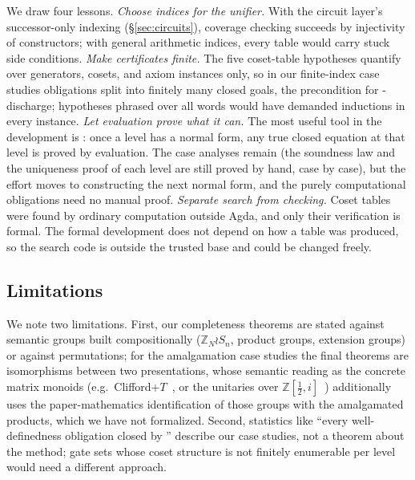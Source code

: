 We draw four lessons.  \emph{Choose indices for
the unifier.}  With the circuit layer's successor-only indexing
(\S\ref{sec:circuits}), coverage checking succeeds by injectivity of
constructors; with general arithmetic indices, every table would carry
stuck side conditions.  \emph{Make certificates finite.}  The five coset-table
hypotheses quantify over generators, cosets, and axiom instances only,
so in our finite-index case studies obligations split into finitely many closed goals, the
precondition for -discharge; hypotheses phrased over all words
would have demanded inductions in every instance.  \emph{Let evaluation
prove what it can.}  The most useful tool in the development
is : once a level has a normal form, any true
closed equation at that level is proved by evaluation.  The case analyses
remain (the soundness law and
the uniqueness proof of each level are still proved by hand, case by
case), but the effort moves to constructing the next normal form,
and the purely computational obligations need no manual proof.
\emph{Separate search from checking.}  Coset tables were found by
ordinary computation outside Agda, and only their verification is
formal.  The formal development does not depend on how a table was
produced, so the search code is outside the trusted base and could be
changed freely.

\subsection{Limitations}\label{sec:threats}

We note two limitations.  First, our completeness theorems are stated against
semantic groups built compositionally ($\mathbb{Z}_N \wr S_n$, product
groups, extension groups) or against permutations; for the amalgamation
case studies the final theorems are isomorphisms between two
presentations, whose semantic reading as the concrete matrix
monoids (e.g.\ Clifford+$T$~\cite{giles2013remarks,glaudell2019qutrit},
or the unitaries over
$\mathbb{Z}[\tfrac12,i]$~\cite{amy2020numbertheoretic,bian2021un})
additionally uses the paper-mathematics identification of those groups
with the amalgamated products, which we have not formalized.
Second, statistics like ``every well-definedness obligation closed by
'' describe our case studies, not a theorem about the method;
gate sets whose coset structure is not finitely enumerable per level
would need a different approach.
